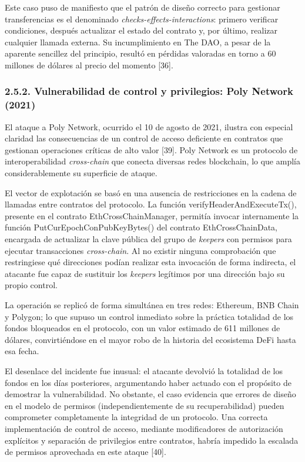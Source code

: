 Este caso puso de manifiesto que el patrón de diseño correcto para
gestionar transferencias es el denominado
\emph{checks-effects-interactions}: primero verificar condiciones,
después actualizar el estado del contrato y, por último, realizar
cualquier llamada externa. Su incumplimiento en The DAO, a pesar de la
aparente sencillez del principio, resultó en pérdidas valoradas en torno
a 60 millones de dólares al precio del momento {[}36{]}.

\subsubsection{2.5.2. Vulnerabilidad de control y privilegios: Poly
Network
(2021)}\label{vulnerabilidad-de-control-y-privilegios-poly-network-2021}

El ataque a Poly Network, ocurrido el 10 de agosto de 2021, ilustra con
especial claridad las consecuencias de un control de acceso deficiente
en contratos que gestionan operaciones críticas de alto valor {[}39{]}.
Poly Network es un protocolo de interoperabilidad \emph{cross-chain} que
conecta diversas redes blockchain, lo que amplía considerablemente su
superficie de ataque.

El vector de explotación se basó en una ausencia de restricciones en la
cadena de llamadas entre contratos del protocolo. La función
verifyHeaderAndExecuteTx(), presente en el contrato
EthCrossChainManager, permitía invocar internamente la función
PutCurEpochConPubKeyBytes() del contrato EthCrossChainData, encargada de
actualizar la clave pública del grupo de \emph{keepers} con permisos
para ejecutar transacciones \emph{cross-chain}. Al no existir ninguna
comprobación que restringiese qué direcciones podían realizar esta
invocación de forma indirecta, el atacante fue capaz de sustituir los
\emph{keepers} legítimos por una dirección bajo su propio control.

La operación se replicó de forma simultánea en tres redes: Ethereum, BNB
Chain y Polygon; lo que supuso un control inmediato sobre la práctica
totalidad de los fondos bloqueados en el protocolo, con un valor
estimado de 611 millones de dólares, convirtiéndose en el mayor robo de
la historia del ecosistema DeFi hasta esa fecha.

El desenlace del incidente fue inusual: el atacante devolvió la
totalidad de los fondos en los días posteriores, argumentando haber
actuado con el propósito de demostrar la vulnerabilidad. No obstante, el
caso evidencia que errores de diseño en el modelo de permisos
(independientemente de su recuperabilidad) pueden comprometer
completamente la integridad de un protocolo. Una correcta implementación
de control de acceso, mediante modificadores de autorización explícitos
y separación de privilegios entre contratos, habría impedido la escalada
de permisos aprovechada en este ataque {[}40{]}.

